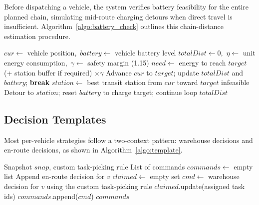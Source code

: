 Before dispatching a vehicle, the system verifies battery feasibility for the entire planned chain, simulating mid-route charging detours when direct travel is insufficient. Algorithm~\ref{algo:battery_check} outlines this chain-distance estimation procedure.

\begin{algorithm}[H]
    \caption{Battery Pre-check with Mid-Route Recharge}
    \label{algo:battery_check}
    \begin{algorithmic}[1]
            \State $cur \gets$ vehicle position,\ $battery \gets$ vehicle battery level
            \State $totalDist \gets 0$,\ $\eta \gets$ unit energy consumption,\ $\gamma \gets$ safety margin (1.15)
                \Loop
                    \State $need \gets$ energy to reach $target$ (+ station buffer if required) $\times \gamma$
                        \State Advance $cur$ to $target$; update $totalDist$ and $battery$; \textbf{break}
                    \EndIf
                    \State $station \gets$ best transit station from $cur$ toward $target$
                     \Return infeasible \EndIf
                    \State Detour to $station$; reset $battery$ to charge target; continue loop
                \EndLoop
            \EndFor
            \State \Return $totalDist$
        \EndFunction
    \end{algorithmic}
\end{algorithm}

\subsection{Decision Templates}

Most per-vehicle strategies follow a two-context pattern: warehouse decisions and en-route decisions, as shown in Algorithm~\ref{algo:template}.

\begin{algorithm}[H]
    \caption{Unified Per-Vehicle Decision Template}
    \label{algo:template}
    \begin{algorithmic}[1]
        \Require Snapshot $snap$, custom task-picking rule
        \Ensure List of commands
        \State $commands \gets$ empty list
            \State Append en-route decision for $v$
        \EndFor
        \State $claimed \gets$ empty set
            \State $cmd \gets$ warehouse decision for $v$ using the custom task-picking rule
             \State $claimed$.update(assigned task ids) \EndIf
            \State $commands$.append($cmd$)
        \EndFor
        \State \Return $commands$
    \end{algorithmic}
\end{algorithm}

